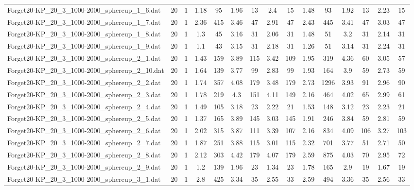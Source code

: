 \begin{table}[!ht]
{\begin{tabular}{lcccccccccccccc}
Forget20-KP\_20\_3\_1000-2000\_sphereup\_1\_6.dat & 20 & 1 & 1.18 & 95 & 1.96 & 13 & 2.4 & 15 & 1.48 & 93 & 1.92 & 13 & 2.23 & 15 \\
Forget20-KP\_20\_3\_1000-2000\_sphereup\_1\_7.dat & 20 & 1 & 2.36 & 415 & 3.46 & 47 & 2.91 & 47 & 2.43 & 445 & 3.41 & 47 & 3.03 & 47 \\
Forget20-KP\_20\_3\_1000-2000\_sphereup\_1\_8.dat & 20 & 1 & 1.3 & 45 & 3.16 & 31 & 2.06 & 31 & 1.48 & 51 & 3.2 & 31 & 2.14 & 31 \\
Forget20-KP\_20\_3\_1000-2000\_sphereup\_1\_9.dat & 20 & 1 & 1.1 & 43 & 3.15 & 31 & 2.18 & 31 & 1.26 & 51 & 3.14 & 31 & 2.24 & 31 \\
Forget20-KP\_20\_3\_1000-2000\_sphereup\_2\_1.dat & 20 & 1 & 1.43 & 159 & 3.89 & 115 & 3.42 & 109 & 1.95 & 319 & 4.36 & 60 & 3.05 & 57 \\
Forget20-KP\_20\_3\_1000-2000\_sphereup\_2\_10.dat & 20 & 1 & 1.64 & 139 & 3.77 & 99 & 2.83 & 99 & 1.93 & 164 & 3.9 & 59 & 2.73 & 59 \\
Forget20-KP\_20\_3\_1000-2000\_sphereup\_2\_2.dat & 20 & 1 & 1.74 & 357 & 4.08 & 179 & 3.48 & 179 & 2.73 & 1296 & 3.93 & 91 & 2.96 & 90 \\
Forget20-KP\_20\_3\_1000-2000\_sphereup\_2\_3.dat & 20 & 1 & 1.78 & 219 & 4.3 & 151 & 4.11 & 149 & 2.16 & 464 & 4.02 & 65 & 2.99 & 61 \\
Forget20-KP\_20\_3\_1000-2000\_sphereup\_2\_4.dat & 20 & 1 & 1.49 & 105 & 3.18 & 23 & 2.22 & 21 & 1.53 & 148 & 3.12 & 23 & 2.23 & 21 \\
Forget20-KP\_20\_3\_1000-2000\_sphereup\_2\_5.dat & 20 & 1 & 1.37 & 165 & 3.89 & 145 & 3.03 & 145 & 1.91 & 246 & 3.84 & 59 & 2.81 & 59 \\
Forget20-KP\_20\_3\_1000-2000\_sphereup\_2\_6.dat & 20 & 1 & 2.02 & 315 & 3.87 & 111 & 3.39 & 107 & 2.16 & 834 & 4.09 & 106 & 3.27 & 103 \\
Forget20-KP\_20\_3\_1000-2000\_sphereup\_2\_7.dat & 20 & 1 & 1.87 & 251 & 3.88 & 115 & 3.01 & 115 & 2.32 & 701 & 3.77 & 51 & 2.71 & 50 \\
Forget20-KP\_20\_3\_1000-2000\_sphereup\_2\_8.dat & 20 & 1 & 2.12 & 303 & 4.42 & 179 & 4.07 & 179 & 2.59 & 875 & 4.03 & 70 & 2.95 & 72 \\
Forget20-KP\_20\_3\_1000-2000\_sphereup\_2\_9.dat & 20 & 1 & 1.2 & 139 & 1.96 & 23 & 1.34 & 23 & 1.78 & 165 & 2.9 & 19 & 1.67 & 19 \\
Forget20-KP\_20\_3\_1000-2000\_sphereup\_3\_1.dat & 20 & 1 & 2.8 & 425 & 3.34 & 35 & 2.55 & 33 & 2.59 & 494 & 3.36 & 35 & 2.56 & 33 \\

\end{tabular}}
\end{table}
